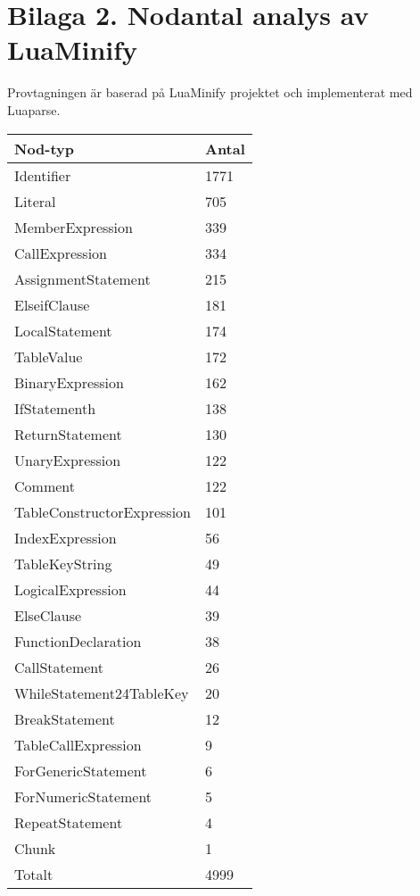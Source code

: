 \section*{Bilaga 2. Nodantal analys av LuaMinify}

Provtagningen är baserad på LuaMinify projektet och implementerat med Luaparse.

\begin{table}[ht]
  \begin{tabular}{l l}
    Nod-typ & Antal \\
    \hline
    Identifier & 1771 \\
    Literal & 705 \\
    MemberExpression & 339 \\
    CallExpression & 334 \\
    AssignmentStatement & 215 \\
    ElseifClause & 181 \\
    LocalStatement & 174 \\
    TableValue & 172 \\
    BinaryExpression & 162 \\
    IfStatementh & 138 \\
    ReturnStatement & 130 \\
    UnaryExpression & 122 \\
    Comment & 122 \\
    TableConstructorExpression & 101 \\
    IndexExpression & 56 \\
    TableKeyString & 49 \\
    LogicalExpression & 44 \\
    ElseClause & 39 \\
    FunctionDeclaration & 38 \\
    CallStatement & 26 \\
    WhileStatement24TableKey & 20 \\
    BreakStatement & 12 \\
    TableCallExpression & 9 \\
    ForGenericStatement & 6 \\
    ForNumericStatement & 5 \\
    RepeatStatement & 4 \\
    Chunk & 1 \\
    \hline
    Totalt & 4999
  \end{tabular}
\end{table}
